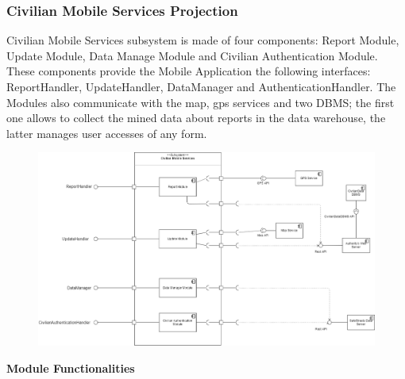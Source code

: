 \documentclass[12pt,a4paper]{article}
\begin{document}
\subsubsection{Civilian Mobile Services Projection}
Civilian Mobile Services subsystem is made of four components: Report Module, Update Module, Data Manage Module and Civilian Authentication Module.
These components provide the Mobile Application the following interfaces: ReportHandler, UpdateHandler, DataManager and AuthenticationHandler. The Modules also communicate with the map, gps services and two DBMS; the first one allows to collect the mined data about reports in the data warehouse, the latter manages user accesses of any form.
\begin{figure}[H]
				\centering
					\begin{adjustwidth}{-25mm}{-25mm}
					        \includegraphics[width=0.9\paperwidth]{Images/CivilianMobileServicesProjection}
					\end{adjustwidth}
			\end{figure}
\textbf{Module Functionalities}
\end{document}
